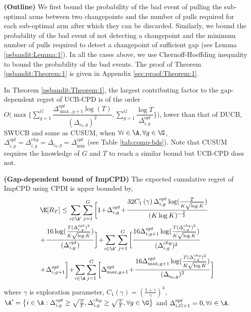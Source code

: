 \begin{customproof}{3} \textbf{(Outline)}
We first bound the probability of the bad event of pulling the sub-optimal arms between two changepoints and the number of pulls required for each sub-optimal arm after which they can be discarded. Similarly, we bound the probability of the bad event of not detecting a changepoint and the minimum number of pulls required to detect a  changepoint of sufficient gap (see Lemma \ref{psbandit:Lemma:1}). In all the cases above, we use Chernoff-Hoeffding inequality to bound the probability of the bad events. The proof of Theorem \ref{psbandit:Theorem:1} is given in Appendix \ref{sec:proof:Theorem:1}.
\end{customproof}

\begin{discussion}
\label{dis:Theorem:1}
In Theorem \ref{psbandit:Theorem:1}, the largest contributing factor to the gap-dependent regret of  UCB-CPD is of the order $O\big(\!\max\big\lbrace \sum\limits_{g=1}^G\dfrac{\Delta^{opt}_{\max,g+1}\log(T)}{(\Delta^{}_{\epsilon_0, g})^{2}},   \! \sum\limits_{g=1}^G\dfrac{\log T}{\Delta^{opt}_{i,g}}\big\rbrace\big)$, lower than that of DUCB, SWUCB and same as CUSUM,  when $\forall i\in\A, \forall g\in\G$, $\Delta^{opt}_{i,g} = \Delta^{chg}_{i,g} = \Delta^{}_{\epsilon_0, g} = \Delta^{opt}_{\min}$ (see Table \ref{tab:comp-bds}). Note that CUSUM requires the knowledge of $G$ and $T$ to reach a similar bound but UCB-CPD does not. 
\end{discussion}


\begin{customtheorem}{2}\textbf{(Gap-dependent bound of ImpCPD)}
\label{psbandit:Theorem:2}
The expected cumulative regret of ImpCPD using CPDI is upper bounded by,
\begin{align*}
& \E[R_T] \leq \sum_{i\in\A'}\sum_{j=1}^{G}\bigg[ 1 \!+\! \Delta^{opt}_{i,g}  \!+\!  \dfrac{32 C_1\left(\gamma \right)\Delta^{opt}_{i,g}\log(\frac{T}{K\sqrt{\log K}} )}{(K\log K)^{-\frac{3}{2}}} \\
& \!+\! \dfrac{16\log(\frac{T (\Delta^{opt}_{i,g})^2}{K\sqrt{\log K}})}{(\Delta^{opt}_{i,g})} \bigg] \!+\! \sum_{i\in\A'}\sum_{j=1}^{G}\bigg[ \dfrac{16\Delta^{opt}_{i,g+1}\log(\frac{T(\Delta^{chg}_{i,g})^2}{K\sqrt{\log K}})}{(\Delta^{chg}_{i,g})^2}  \\
 & \!+\! \Delta^{opt}_{i,g+1} \bigg] \!+\! \sum_{i\in\A}\sum_{j=1}^{G}\bigg[\Delta^{opt}_{\max,g+1} \!+\! \dfrac{16 \Delta^{opt}_{\max,g+1}\log( \frac{T(\Delta^{chg}_{i,g})^2}{K\sqrt{\log K}})}{(\Delta^{}_{\epsilon_0, g})^2}\bigg]\!
\end{align*}
where $\gamma$ is exploration parameter, $C_1\left( \gamma\right)=\left( \frac{1+\gamma}{\gamma}\right)^{4}$, $\A'=\big\lbrace i\in\A: \Delta^{opt}_{i,g}\geq \sqrt{\frac{e}{T}}, \Delta^{chg}_{i,g}\geq \sqrt{\frac{e}{T}},\forall g\in\G \big\rbrace$ and $\Delta^{opt}_{i,{G+1}} = 0,\forall i\in\A$.
\end{customtheorem}


